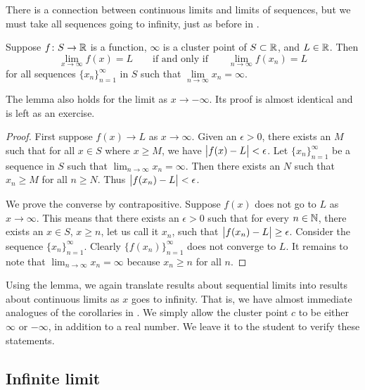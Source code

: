 There is a connection between continuous limits and limits of sequences, but we must take all
sequences going to infinity, just as before in .

\begin{lemma} \label{seqflimitinf:lemma}
Suppose $f \colon S \to {\mathbb{R}}$ is a function, $\infty$ is a cluster
point of $S \subset {\mathbb{R}}$, and $L \in {\mathbb{R}}$.  Then
\begin{equation*}
\lim_{x\to\infty} f(x) = L
\qquad \text{if and only if} \qquad
\lim_{n\to\infty} f(x_n) = L
\end{equation*}
for all sequences $\{ x_n \}_{n=1}^\infty$ in $S$ such that $\lim\limits_{n\to\infty} x_n = \infty$.
\end{lemma}

The lemma also holds for the limit as $x \to -\infty$.
Its proof is almost identical and
is left as an exercise.

\begin{proof}
First suppose $f(x) \to L$ as $x \to \infty$.
Given an $\epsilon > 0$, there exists an $M$ such that for all $x \in S$
where $x \geq M$,
we have $\bigl\lvert {f(x)-L} \bigr\rvert < \epsilon$.
Let $\{ x_n \}_{n=1}^\infty$
be a sequence in $S$ such that $\lim_{n\to\infty} x_n = \infty$.  Then there exists an
$N$ such that
$x_n \geq M$
for all $n \geq N$.
Thus
$\bigl\lvert {f(x_n)-L} \bigr\rvert < \epsilon$.

We prove the converse by contrapositive.  Suppose $f(x)$ does
not go to $L$ as $x \to \infty$.
This means that there exists an $\epsilon > 0$
such that for every $n \in {\mathbb{N}}$, there exists an $x \in S$, $x \geq n$, let
us call it $x_n$, such that $\bigl\lvert {f(x_n)-L} \bigr\rvert \geq \epsilon$.
Consider the sequence $\{ x_n \}_{n=1}^\infty$.  Clearly 
$\bigl\{ f(x_n) \bigr\}_{n=1}^\infty$ does not converge to $L$.  It remains to note
that $\lim_{n\to\infty} x_n = \infty$ because $x_n \geq n$ for all $n$.
\end{proof}

Using the lemma, we again translate results about sequential
limits into results about continuous limits as $x$ goes to infinity.  That
is, we have almost immediate analogues of the corollaries
in .  We simply allow 
the cluster point $c$ to be either $\infty$ or $-\infty$, in addition
to a real number.  We leave it to
the student to verify these statements.

\subsection{Infinite limit}


